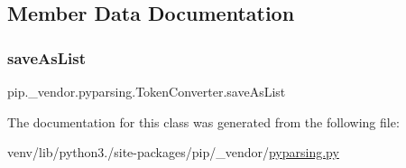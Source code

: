 \subsection{Member Data Documentation}
\mbox{\label{classpip_1_1__vendor_1_1pyparsing_1_1TokenConverter_af5c7b1af9bca9dd30fc24a780d1117c8}} 
\subsubsection{\texorpdfstring{save\+As\+List}{saveAsList}}
{\footnotesize\ttfamily pip.\+\_\+vendor.\+pyparsing.\+Token\+Converter.\+save\+As\+List}



The documentation for this class was generated from the following file\+:\begin{DoxyCompactItemize}
\item 
venv/lib/python3./site-\/packages/pip/\+\_\+vendor/\hyperlink{pip_2__vendor_2pyparsing_8py}{pyparsing.\+py}\end{DoxyCompactItemize}
